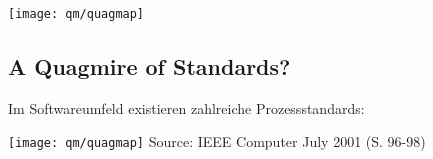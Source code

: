 \newpage
\ifslides
\begin{center}
\texttt{[image: qm/quagmap]}
\end{center}
\newpage
\else
\subsection{A Quagmire of Standards?}
Im Softwareumfeld existieren zahlreiche Prozessstandards:

\texttt{[image: qm/quagmap]}
\hfill Source: IEEE Computer July
2001 (S. 96-98)
\fi

